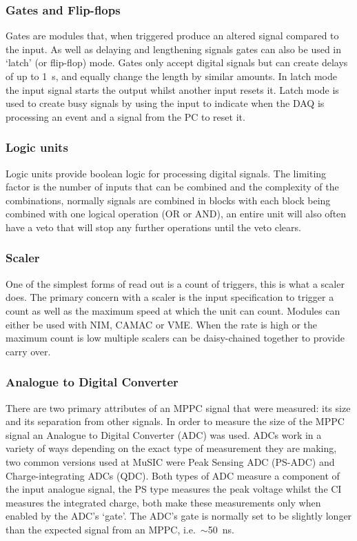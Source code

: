 \subsubsection{Gates and Flip-flops} %
\label{ssub:gates}
Gates are modules that, when triggered produce an altered signal compared to the input. As well as delaying and lengthening signals gates can also be used in `latch' (or flip-flop) mode. Gates only accept digital signals but can create delays of up to 1~s, and equally change the length by similar amounts. In latch mode the input signal starts the output whilst another input resets it. Latch mode is used to create busy signals by using the input to indicate when the DAQ is processing an event and a signal from the PC to reset it.

\subsubsection{Logic units} %
\label{ssub:logic_units}
Logic units provide boolean logic for processing digital signals. The limiting factor is the number of inputs that can be combined and the complexity of the combinations, normally signals are combined in blocks with each block being combined with one logical operation (OR or AND), an entire unit will also often have a veto that will stop any further operations until the veto clears.

\subsubsection{Scaler} %
\label{ssub:scaler}
One of the simplest forms of read out is a count of triggers, this is what a scaler does. The primary concern with a scaler is the input specification to trigger a count as well as the maximum speed at which the unit can count. Modules can either be used with NIM, CAMAC or VME. When the rate is high or the maximum count is low multiple scalers can be daisy-chained together to provide carry over. 
\subsubsection{Analogue to Digital Converter} %
\label{ssub:analogue_to_digital_converter}
There are two primary attributes of an MPPC signal that were measured: its size and its separation from other signals. In order to measure the size of the MPPC signal an Analogue to Digital Converter (ADC) was used. ADCs work in a variety of ways depending on the exact type of measurement they are making, two common versions used at MuSIC were Peak Sensing ADC (PS-ADC) and Charge-integrating ADCs (QDC). Both types of ADC measure a component of the input analogue signal, the PS type measures the peak voltage whilst the CI measures the integrated charge, both make these measurements only when enabled by the ADC's `gate'. The ADC's gate is normally set to be slightly longer than the expected signal from an MPPC, i.e.\ \( \sim \)50~ns. 

